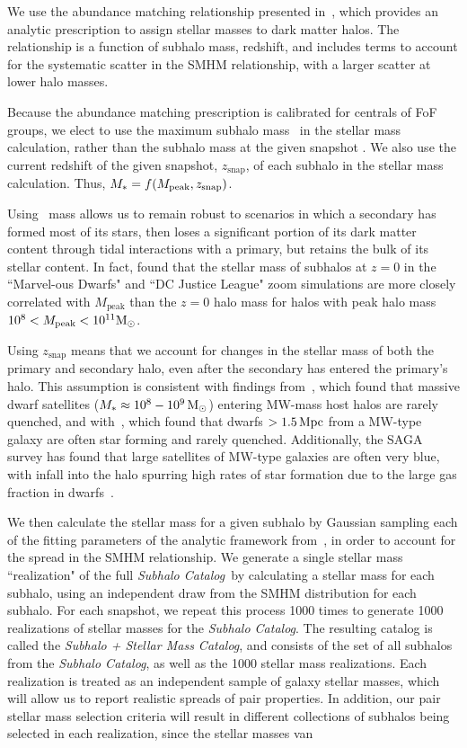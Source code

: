 \documentclass[twocolumn]{aastex631}
\newcommand{\ms}[1]{\ensuremath{M_{*{#1}}}}
\newcommand{\subcat}{\textit{Subhalo Catalog}}
\newcommand{\starcat}{\textit{Subhalo + Stellar Mass Catalog}}
\begin{document}
    We use the abundance matching relationship presented in~\citet{Moster2013}, which provides an analytic prescription to assign stellar masses to dark matter halos. 
    The~\citet{Moster2013} relationship is a function of subhalo mass, redshift, and includes terms to account for the systematic scatter in the SMHM relationship, with a larger scatter at lower halo masses.
    
    Because the abundance matching prescription is calibrated for centrals of FoF groups, we elect to use the maximum subhalo mass \Mpeak\ in the stellar mass calculation, rather than the subhalo mass at the given snapshot \citep[see][]{Besla2018}.
    We also use the current redshift of the given snapshot, $z_{\mathrm{snap}}$, of each subhalo in the stellar mass calculation. 
    Thus, $\ms{}=f(\Mpeak,z_{\mathrm{snap}})$. 
    
    Using \Mpeak\ mass allows us to remain robust to scenarios in which a secondary has formed most of its stars, then loses a significant portion of its dark matter content through tidal interactions with a primary, but retains the bulk of its stellar content.
    In fact, \citet{Munshi2021} found that the stellar mass of subhalos at $z=0$ in the ``Marvel-ous Dwarfs" and ``DC Justice League" zoom simulations are more closely correlated with $M_{\mathrm{peak}}$ than the $z=0$ halo mass for halos with peak halo mass $10^8<M_{\rm peak}<10^{11} \mathrm{M}_\odot$. 

    Using $z_{\mathrm{snap}}$ means that we account for changes in the stellar mass of both the primary and secondary halo, even after the secondary has entered the primary's halo. 
    This assumption is consistent with findings from~\cite{Akins2021}, which found that massive dwarf satellites ($M_*\approx 10^8-10^9\, \mathrm{M}_\odot$) entering MW-mass host halos are rarely quenched, and with~\cite{Geha2013}, which found that dwarfs $>1.5\,\mathrm{Mpc}$ from a MW-type galaxy are often star forming and rarely quenched.
    Additionally, the SAGA survey has found that large satellites of MW-type galaxies are often very blue, with infall into the halo spurring high rates of star formation due to the large gas fraction in dwarfs~\citep{Mao2021}. 

    We then calculate the stellar mass for a given subhalo by Gaussian sampling each of the fitting parameters of the analytic framework from~\cite{Moster2013}, in order to account for the spread in the SMHM relationship.
    We generate a single stellar mass ``realization" of the full \subcat\ by calculating a stellar mass for each subhalo, using an independent draw from the SMHM distribution for each subhalo. 
    For each snapshot, we repeat this process 1000 times to generate 1000 realizations of stellar masses for the \subcat.
    The resulting catalog is called the \starcat, and consists of the set of all subhalos from the \subcat, as well as the 1000 stellar mass realizations. 
    Each realization is treated as an independent sample of galaxy stellar masses, which will allow us to report realistic spreads of pair properties. In addition, our pair stellar mass selection criteria will result in different collections of subhalos being selected in each realization, since the stellar masses van 
\end{document}
